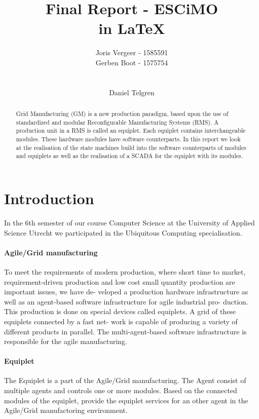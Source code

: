 \documentclass[12pt,a4paper]{report}
\title{
Final Report - ESCiMO \\
in \LaTeX{}
}
\author{
Joris Vergeer - 1585591\\
Gerben Boot - 1575754\\
\\
\\
Daniel Telgren
}
\begin{document}
\maketitle

\begin{abstract}
Grid Manufacturing (GM) is a new production paradigm, based upon the use of standardized and modular Reconfigurable Manufacturing Systems (RMS).\cite{SICE13}
A production unit in a RMS is called an equiplet.
Each equiplet contains interchangeable modules. 
These hardware modules have software counterparts.
In this report we look at the realisation of the state machines build into the software counterparts of modules and equiplets as well as the realisation of a SCADA for the equiplet with its modules.
\end{abstract}

\tableofcontents


\chapter{Introduction}
In the 6th semester of our course Computer Science at the University of Applied Science Utrecht we participated in the Ubiquitous Computing specialisation.

\subsubsection{Agile/Grid manufacturing}
To meet the requirements of modern production, where short
time to market, requirement-driven production and low cost
small quantity production are important issues, we have de-
veloped a production hardware infrastructure as well as an
agent-based software infrastructure for agile industrial pro-
duction. This production is done on special devices called
equiplets. A grid of these equiplets connected by a fast net-
work is capable of producing a variety of different products
in parallel. The multi-agent-based software infrastructure is
responsible for the agile manufacturing.\cite{Paper70}

\subsubsection{Equiplet}
The Equiplet is a part of the Agile/Grid manufacturing. The Agent consist of multiple agents and controls one or more modules. Based on the connected modules of the equiplet, provide the equiplet services for an other agent in the Agile/Grid manufactoring environment. 
\end{document}

